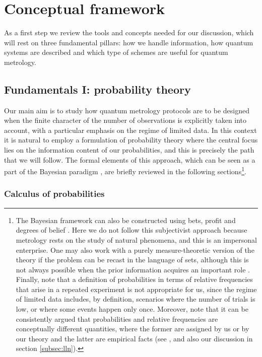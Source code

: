 \chapter{Conceptual framework}
\label{chap:conceptual}

As a first step we review the tools and concepts needed for our discussion, which will rest on three fundamental pillars: how we handle information, how quantum systems are described and which type of schemes are useful for quantum metrology. 

\section{Fundamentals I: probability theory}
\label{sec:probability}

Our main aim is to study how quantum metrology protocols are to be designed when the finite character of the number of observations is explicitly taken into account, with a particular emphasis on the regime of limited data. In this context it is natural to employ a formulation of probability theory where the central focus lies on the information content of our probabilities, and this is precisely the path that we will follow. The formal elements of this approach, which can be seen as a part of the Bayesian paradigm \cite{jaynes2003}, are briefly reviewed in the following sections\footnote{The Bayesian framework can also be constructed using bets, profit and degrees of belief \cite{definetti1990, bernardo1994}. Here we do not follow this subjectivist approach because metrology rests on the study of natural phenomena, and this is an impersonal enterprise. One may also work with a purely measure-theoretic version of the theory \cite{rosenthal2006} if the problem can be recast in the language of sets, although this is not always possible when the prior information acquires an important role \cite{jaynes2003}. Finally, note that a definition of probabilities in terms of relative frequencies that arise in a repeated experiment is not appropriate for us, since the regime of limited data includes, by definition, scenarios where the number of trials is low, or where some events happen only once. Moreover, note that it can be consistently argued that probabilities and relative frequencies are conceptually different quantities, where the former are assigned by us or by our theory and the latter are empirical facts (see \cite{jaynes2003, jeffreys1961, jiangwei2014}, and also our discussion in section \ref{subsec:lln}).}. 

\subsection{Calculus of probabilities}
\label{subsec:calprob}

